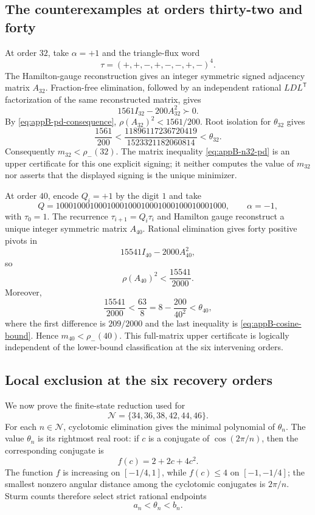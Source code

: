 \subsection{The counterexamples at orders thirty-two and forty}
\label{app:orders-32-40}

At order \(32\), take \(\alpha=+1\) and the triangle-flux word
\[
 \tau=(+,+,-,+,-,-,+,-)^4.
\]
The Hamilton-gauge reconstruction gives an integer symmetric signed
adjacency matrix \(A_{32}\). Fraction-free elimination, followed by
an independent rational \(LDL^{\mathsf T}\) factorization of the same
reconstructed matrix, gives
\begin{equation}\label{eq:appB-n32-pd}
 1561I_{32}-200A_{32}^2\succ0.
\end{equation}
By \eqref{eq:appB-pd-consequence},
\(\rho(A_{32})^2<1561/200\). Root isolation for \(\theta_{32}\)
gives
\[
 \frac{1561}{200}
 <\frac{11896117236720419}{1523321182060814}
 <\theta_{32}.
\]
Consequently \(m_{32}<\rho_-(32)\).  The matrix inequality
\eqref{eq:appB-n32-pd} is an upper certificate for this one explicit
signing; it neither computes the value of \(m_{32}\) nor asserts that
the displayed signing is the unique minimizer.

At order \(40\), encode \(Q_i=+1\) by the digit \(1\) and take
\[
 Q=1000100010001000100010001000100010001000,
 \qquad \alpha=-1,
\]
with \(\tau_0=1\).  The recurrence \(\tau_{i+1}=Q_i\tau_i\) and Hamilton
gauge reconstruct a unique integer symmetric matrix \(A_{40}\).
Rational elimination gives forty positive pivots in
\begin{equation}\label{eq:appB-n40-pd}
 15541I_{40}-2000A_{40}^2,
\end{equation}
so
\[
 \rho(A_{40})^2<\frac{15541}{2000}.
\]
Moreover,
\[
 \frac{15541}{2000}<\frac{63}{8}
 =8-\frac{200}{40^2}<\theta_{40},
\]
where the first difference is \(209/2000\) and the last inequality is
\eqref{eq:appB-cosine-bound}.  Hence \(m_{40}<\rho_-(40)\).  This
full-matrix upper certificate is logically independent of the lower-bound
classification at the six intervening orders.

\subsection{Local exclusion at the six recovery orders}
\label{app:local-exclusion}

We now prove the finite-state reduction used for
\[
 \mathcal N=\{34,36,38,42,44,46\}.
\]
For each \(n\in\mathcal N\), cyclotomic elimination gives the minimal
polynomial of \(\theta_n\).  The value \(\theta_n\) is its rightmost real
root: if \(c\) is a conjugate of \(\cos(2\pi/n)\), then the corresponding
conjugate is
\[
 f(c)=2+2c+4c^2.
\]
The function \(f\) is increasing on \([-1/4,1]\), while \(f(c)\leq4\) on
\([-1,-1/4]\); the smallest nonzero angular distance among the cyclotomic
conjugates is \(2\pi/n\). Sturm counts therefore select strict
rational endpoints
\begin{equation}\label{eq:appB-isolating-interval}
 a_n<\theta_n<b_n.
\end{equation}

